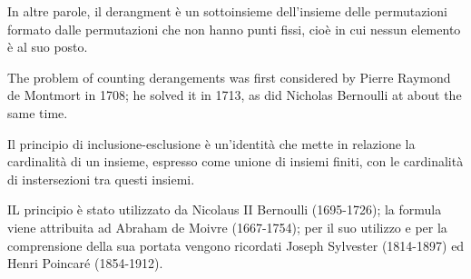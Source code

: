 In altre parole, il derangment è un sottoinsieme dell'insieme delle permutazioni formato dalle permutazioni che non hanno punti fissi, cioè 
in cui nessun elemento è al suo posto.

The problem of counting derangements was first considered by Pierre Raymond de Montmort in 1708; he solved it in 1713, as did
Nicholas Bernoulli at about the same time. 

\begin{definizione}
	Il principio di inclusione-esclusione è un'identità che mette in relazione la cardinalità di un insieme, espresso come unione di insiemi finiti,
	con le cardinalità di instersezioni tra questi insiemi.
\end{definizione}

IL principio è stato utilizzato da Nicolaus II Bernoulli (1695-1726); la formula viene attribuita ad Abraham de Moivre (1667-1754);
per il suo utilizzo e per la comprensione della sua portata vengono ricordati Joseph Sylvester (1814-1897) ed Henri Poincaré (1854-1912). 



